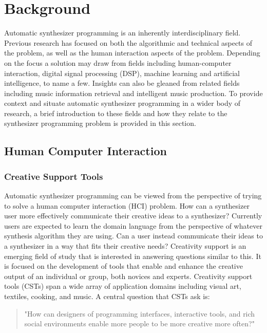 
\section{Background}
Automatic synthesizer programming is an inherently interdisciplinary field. Previous research has focused on both the algorithmic and technical aspects of the problem, as well as the human interaction aspects of the problem. Depending on the focus a solution may draw from fields including human-computer interaction, digital signal processing (DSP), machine learning and artificial intelligence, to name a few. Insights can also be gleaned from related fields including music information retrieval and intelligent music production. To provide context and situate automatic synthesizer programming in a wider body of research, a brief introduction to these fields and how they relate to the synthesizer programming problem is provided in this section.

\subsection{Human Computer Interaction}
\subsubsection{Creative Support Tools}
Automatic synthesizer programming can be viewed from the perspective of trying to solve a human computer interaction (HCI) problem. How can a synthesizer user more effectively communicate their creative ideas to a synthesizer? Currently users are expected to learn the domain language from the perspective of whatever synthesis algorithm they are using. Can a user instead communicate their ideas to a synthesizer in a way that fits their creative needs? Creativity support is an emerging field of study that is interested in answering questions similar to this. It is focused on the development of tools that enable and enhance the creative output of an individual or group, both novices and experts. Creativity support tools (CSTs) \cite{shneiderman2007creativity} span a wide array of application domains including visual art, textiles, cooking, and music. A central question that CSTs ask is: 
\begin{quote}
    "How can designers of programming interfaces, interactive tools, and rich social environments enable more people to be more creative more often?"
\end{quote}

